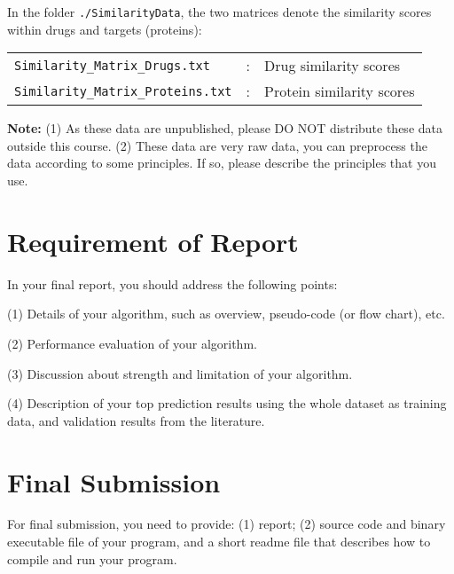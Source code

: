 \documentclass[12pt]{article}
\begin{document}
In the folder \verb+./SimilarityData+, the two matrices denote the
similarity scores within drugs and targets (proteins):

\begin{table}[htpb]
  \centering
  \begin{tabular}{lll}
    \verb/Similarity_Matrix_Drugs.txt/ &: &Drug similarity scores\\
    \verb/Similarity_Matrix_Proteins.txt/ &: &Protein similarity scores
  \end{tabular}
\end{table}

\textbf{Note:} (1) As these data are unpublished, please DO NOT
distribute these data outside this course. (2) These data are very
raw data, you can preprocess the data according to some
principles. If so, please describe the principles that you use.

\section{Requirement of Report}
In your final report, you should address the following points:

(1) Details of your algorithm, such as overview, pseudo-code (or
flow chart), etc.

(2) Performance evaluation of your algorithm.

(3) Discussion about strength and limitation of your algorithm.

(4) Description of your top prediction results using the whole
dataset as training data, and validation results from the
literature.

\section{Final Submission}
For final submission, you need to provide: (1) report; (2) source
code and binary executable file of your program, and a short
readme file that describes how to compile and run your program.
\end{document}
